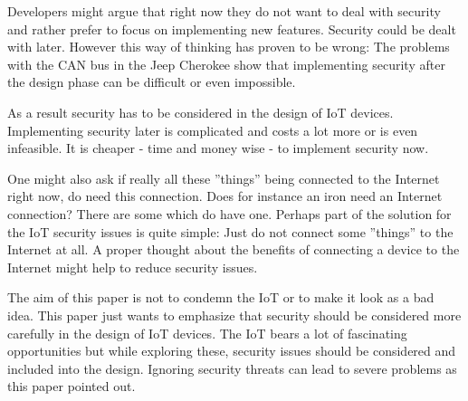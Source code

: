 \documentclass[conference]{IEEEtran}
\begin{document}
Developers might argue that right now they do not want to deal with security 
and rather prefer to focus on implementing new features. Security could be 
dealt with later. However this way of thinking has proven to be wrong: The 
problems with the CAN bus in the Jeep Cherokee show that implementing security 
after the design phase can be difficult or even impossible.

As a result security has to be considered in the design of IoT devices. 
Implementing security later is complicated and costs a lot more or is even 
infeasible. It is cheaper - time and money wise - to implement security now. 

One might also ask if really all these ''things'' being connected to the 
Internet right now, do need this connection. Does for instance an iron need an 
Internet connection? There are some which do have one. Perhaps part of the 
solution for the IoT security issues is quite simple: Just do not connect some 
''things'' to the Internet at all. A proper thought about the benefits of 
connecting a device to the Internet might help to reduce security issues.

The aim of this paper is not to condemn the IoT or to make it look as a bad 
idea. This paper just wants to emphasize that security should be considered 
more carefully in the design of IoT devices. The IoT bears a lot of fascinating 
opportunities but while exploring these, security issues should be considered 
and included into the design. Ignoring security threats can lead to severe 
problems as this paper pointed out.



%
\end{document}
